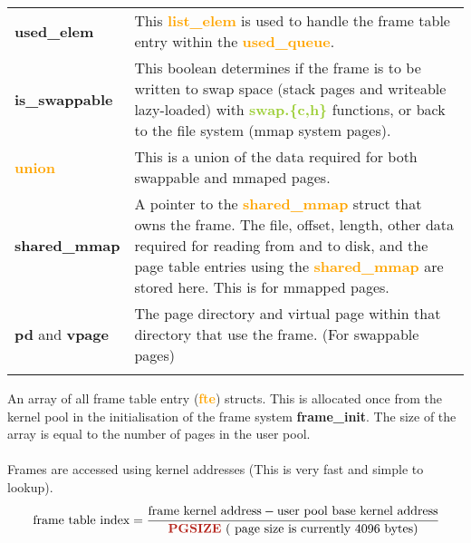 \documentclass{report}
\newcommand{\fun}[1]{\textcolor{Emerald}{\textbf{#1}}}
\newcommand{\file}[1]{\textcolor{YellowGreen}{\textbf{#1}}}
\newcommand{\struct}[1]{\textcolor{orange}{\textbf{#1}}}
\newcommand{\var}[1]{\textcolor{RoyalPurple}{\textbf{#1}}}
\newcommand{\const}[1]{\textcolor{BrickRed}{\textbf{#1}}}
\newcommand{\pintoscode}[4]{}
\newcommand{\pintosfile}[3]{\pintoscode{#1}{#2}{\file{#3}}{#3}}
\begin{document}
				\pintosfile{11}{22}{frame.c}
				\begin{center}
					\begin{tabular}{l p{10cm}}
						\vspace*{2mm}
						\var{used\_elem} & This \struct{list\_elem} is used to 
						handle the frame table entry within the 
						\struct{used\_queue}. \\ \vspace*{2mm}

						\var{is\_swappable}  & This boolean determines if the 
						frame is to be written to swap space (stack pages and 
						writeable lazy-loaded) with \file{swap.\{c,h\}} 
						functions, or back to the file system (mmap system 
						pages). \\ \vspace*{2mm}

						\struct{union}  & This is a union of the data required 
						for both swappable and mmaped pages.  \\ \vspace*{2mm}

						\var{shared\_mmap}  & A pointer to the 
						\struct{shared\_mmap} struct that owns the frame. The 
						file, offset, 
						length, other data required for reading from and to disk, and 
						the page table entries using the \struct{shared\_mmap} are stored
						here. This is for mmapped pages.
						\\ \vspace*{2mm}

						\var{pd} and \var{vpage}  & The page directory and virtual page 
						within that directory that use the frame. (For swappable pages) 
						\\ \vspace*{2mm}
					\end{tabular}
				\end{center}
				
				\pintosfile{38}{38}{frame.c}
				An array of all frame table entry (\struct{fte}) structs. 
				This is allocated once from the kernel pool in the initialisation of the 
				frame system \fun{frame\_init}. The size of the array is equal to the number
				of pages in the user pool.
				\\
				\\ Frames are accessed using kernel addresses (This is very fast and 
				simple to lookup).
				\[\text{frame table index} = \cfrac{\text{frame kernel address} - 
				\text{user pool base kernel address}}{\text{\const{PGSIZE} (
				page size is currently 4096 bytes)}}\]
				
\end{document}
